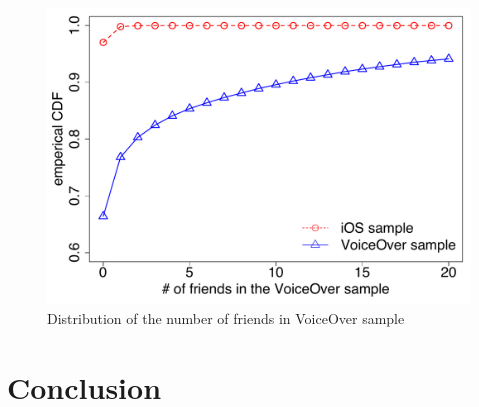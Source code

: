 \documentclass{sigchi}
\begin{document}
\begin{figure}[htb]
\centering
\includegraphics[width=0.9\columnwidth]{interconnectivity.pdf}
\caption{Distribution of the number of friends in VoiceOver sample}
\label{fig:interconnectivity}
\end{figure}







\section{Conclusion}






\end{document}
